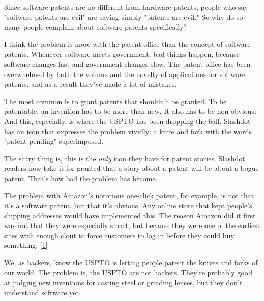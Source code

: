 Since
                  software patents are no different from hardware patents,
                  people who say "software patents are evil" are saying simply
                  "patents are evil." So why do so many people complain about
                  software patents specifically?

I think the problem
                  is more with the patent office than the concept of software
                  patents. Whenever software meets government, bad things
                  happen, because software changes fast and government changes
                  slow. The patent office has been overwhelmed by both the
                  volume and the novelty of applications for software patents,
                  and as a result they've made a lot of mistakes.

The
                  most common is to grant patents that shouldn't be granted. To
                  be patentable, an invention has to be more than new. It also
                  has to be non-obvious. And this, especially, is where the
                  USPTO has been dropping the ball. Slashdot has an icon that
                  expresses the problem vividly: a knife and fork with the words
                  "patent pending" superimposed.

The scary thing is,
                  this is the \emph{only} icon they have for patent stories.
                  Slashdot readers now take it for granted that a story about a
                  patent will be about a bogus patent. That's how bad the
                  problem has become.

The problem with Amazon's
                  notorious one-click patent, for example, is not that it's a
                  software patent, but that it's obvious. Any online store that
                  kept people's shipping addresses would have implemented this.
                  The reason Amazon did it first was not that they were
                  especially smart, but because they were one of the earliest
                  sites with enough clout to force customers to log in before
                  they could buy something.
                  [\href{\#f1n}{1}]

We, as hackers, know the USPTO is letting people
                  patent the knives and forks of our world. The problem is, the
                  USPTO are not hackers. They're probably good at judging new
                  inventions for casting steel or grinding lenses, but they
                  don't understand software yet.

